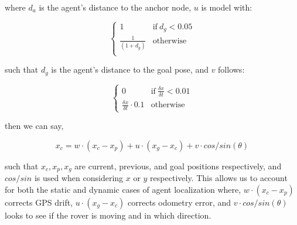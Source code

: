 where $d_a$ is the agent's distance to the anchor node,  $u$ is model with:

\[
\begin{cases}
	1 & \text{if}~d_g < 0.05 \\
	\frac{1}{(1 + d_g)} & \text{otherwise} \\
\end{cases}
\]

such that $d_g$ is the agent's distance to the goal pose, and $v$ follows:

\[
\begin{cases}
	0 & \text{if}~\frac{\delta x}{\delta t} < 0.01 \\
	\frac{\delta x}{\delta t} \cdot 0.1 & \text{otherwise}
\end{cases}
\]

then we can say, 

\begin{equation}
	x_c = w \cdot (x_c - x_p) + u \cdot (x_g - x_c) + v \cdot cos/sin(\theta)
	\label{eq:dy_local}
\end{equation}

such that $x_c, x_p, x_g$ are current, previous, and goal positions respectively, and $cos/sin$ is used when considering $x$ or $y$ respectively. This allows us to account for both the static and dynamic cases of agent localization where, $w \cdot (x_c - x_p)$ corrects GPS drift, $u \cdot (x_g - x_c)$ corrects odometry error, and $v \cdot cos/sin(\theta)$ looks to see if the rover is moving and in which direction.
